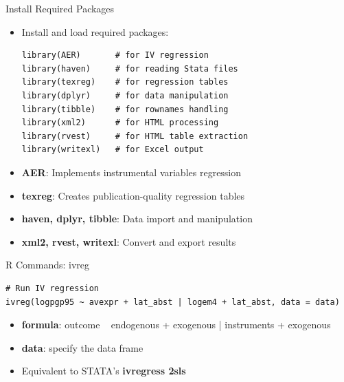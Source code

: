 \documentclass[dvipsnames,hyperref={pdfpagelabels=false}]{beamer}
\begin{document}
\begin{frame}[fragile]{Install Required Packages}
	\begin{itemize}
		\item Install and load required packages:
		\vspace{0.2cm}
\begin{lstlisting}
library(AER)       # for IV regression
library(haven)     # for reading Stata files
library(texreg)    # for regression tables
library(dplyr)     # for data manipulation
library(tibble)    # for rownames handling
library(xml2)      # for HTML processing
library(rvest)     # for HTML table extraction
library(writexl)   # for Excel output
\end{lstlisting}
		\vspace{0.2cm}
		\item \textbf{AER}: Implements instrumental variables regression
				\vspace{0.2cm}
		\item \textbf{texreg}: Creates publication-quality regression tables
				\vspace{0.2cm}
		\item \textbf{haven, dplyr, tibble}: Data import and manipulation
				\vspace{0.2cm}
		\item \textbf{xml2, rvest, writexl}: Convert and export results
	\end{itemize}
\end{frame}

\begin{frame}[fragile]{R Commands: ivreg}
\begin{lstlisting}
# Run IV regression
ivreg(logpgp95 ~ avexpr + lat_abst | logem4 + lat_abst, data = data)
\end{lstlisting}
	\begin{itemize}
		
		\vspace{0.2cm}
		\item \textbf{formula}: outcome ~ endogenous + exogenous | instruments + exogenous
		\vspace{0.2cm}
		\item \textbf{data}: specify the data frame
		\vspace{0.2cm}
		\item Equivalent to STATA's \textbf{ivregress 2sls}
	\end{itemize}
\end{frame}
\end{document}
